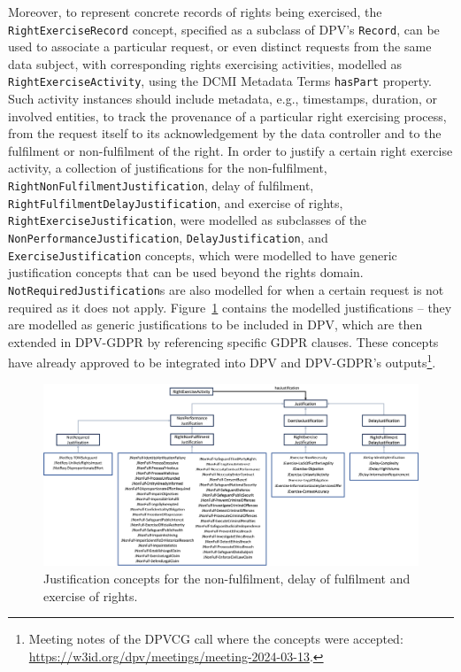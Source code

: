 Moreover, to represent concrete records of rights being exercised, the \texttt{RightExerciseRecord} concept, specified as a subclass of DPV's \texttt{Record}, can be used to associate a particular request, or even distinct requests from the same data subject, with corresponding rights exercising activities, modelled as \texttt{RightExerciseActivity}, using the DCMI Metadata Terms \texttt{hasPart} property.
Such activity instances should include metadata, e.g., timestamps, duration, or involved entities, to track the provenance of a particular right exercising process, from the request itself to its acknowledgement by the data controller and to the fulfilment or non-fulfilment of the right.
In order to justify a certain right exercise activity, a collection of justifications for the non-fulfilment, \texttt{RightNonFulfilmentJustification}, delay of fulfilment, \texttt{RightFulfilmentDelayJustification}, and exercise of rights, \texttt{RightExerciseJustification}, were modelled as subclasses of the \texttt{NonPerformanceJustification}, \texttt{DelayJustification}, and \texttt{ExerciseJustification} concepts, which were modelled to have generic justification concepts that can be used beyond the rights domain.
\texttt{NotRequiredJustification}s are also modelled for when a certain request is not required as it does not apply. 
Figure~\ref{fig:justifications} contains the modelled justifications -- they are modelled as generic justifications to be included in DPV, which are then extended in DPV-GDPR by referencing specific GDPR clauses.
These concepts have already approved to be integrated into DPV and DPV-GDPR's outputs\footnote{Meeting notes of the DPVCG call where the concepts were accepted: \url{https://w3id.org/dpv/meetings/meeting-2024-03-13}.}.

\begin{figure}[ht]
    \centering
    \includegraphics[width=\linewidth]{figures/chapter-4/justifications.png}
    \caption{Justification concepts for the non-fulfilment, delay of fulfilment and exercise of rights.}
    \label{fig:justifications}
\end{figure}

